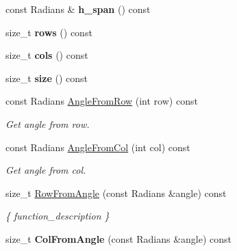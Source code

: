\begin{DoxyCompactItemize}
\item 
\hypertarget{classdepth__clustering_1_1ProjectionParams_a1d234ad50358e81a9b1deb327149b39d}{const Radians \& {\bfseries h\-\_\-span} () const }\label{classdepth__clustering_1_1ProjectionParams_a1d234ad50358e81a9b1deb327149b39d}

\item 
\hypertarget{classdepth__clustering_1_1ProjectionParams_abe3b0e29b5b6128888cb5f5132c77f33}{size\-\_\-t {\bfseries rows} () const }\label{classdepth__clustering_1_1ProjectionParams_abe3b0e29b5b6128888cb5f5132c77f33}

\item 
\hypertarget{classdepth__clustering_1_1ProjectionParams_a5f241024c32f3f6bdf1053ccca42e2ca}{size\-\_\-t {\bfseries cols} () const }\label{classdepth__clustering_1_1ProjectionParams_a5f241024c32f3f6bdf1053ccca42e2ca}

\item 
\hypertarget{classdepth__clustering_1_1ProjectionParams_a423e2bd1fe0c4181a4cc0361b26ae66f}{size\-\_\-t {\bfseries size} () const }\label{classdepth__clustering_1_1ProjectionParams_a423e2bd1fe0c4181a4cc0361b26ae66f}

\item 
const Radians \hyperlink{classdepth__clustering_1_1ProjectionParams_ad9a158502de507a0759b3de14945e9b6}{Angle\-From\-Row} (int row) const 
\begin{DoxyCompactList}\small\item\em Get angle from row. \end{DoxyCompactList}\item 
const Radians \hyperlink{classdepth__clustering_1_1ProjectionParams_a66b766c6a0ebe30e13fa1c44b74d4391}{Angle\-From\-Col} (int col) const 
\begin{DoxyCompactList}\small\item\em Get angle from col. \end{DoxyCompactList}\item 
size\-\_\-t \hyperlink{classdepth__clustering_1_1ProjectionParams_a56adb109880ce29662f47c4be8bfcb70}{Row\-From\-Angle} (const Radians \&angle) const 
\begin{DoxyCompactList}\small\item\em \{ function\-\_\-description \} \end{DoxyCompactList}\item 
\hypertarget{classdepth__clustering_1_1ProjectionParams_ace5fb0bb0d0e02a5c4080b7418e47b70}{size\-\_\-t {\bfseries Col\-From\-Angle} (const Radians \&angle) const }\label{classdepth__clustering_1_1ProjectionParams_ace5fb0bb0d0e02a5c4080b7418e47b70}


\end{DoxyCompactItemize}
